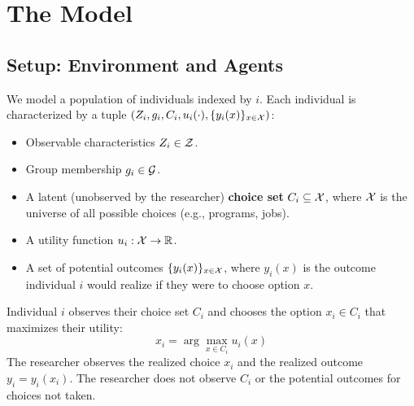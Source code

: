 
\section{The Model}\label{sec:model}

\subsection{Setup: Environment and Agents}


\begin{definition}
We model a population of individuals indexed by $i$. Each individual is characterized by a tuple $(Z_i, g_i, C_i, u_i(\cdot), \{y_i(x)\}_{x \in \mathcal{X}})$:
\begin{itemize}
    \item Observable characteristics $Z_i \in \mathcal{Z}$.
    \item Group membership $g_i \in \mathcal{G}$.
    \item A latent (unobserved by the researcher) \textbf{choice set} $C_i \subseteq \mathcal{X}$, where $\mathcal{X}$ is the universe of all possible choices (e.g., programs, jobs).
    \item A utility function $u_i: \mathcal{X} \to \mathbb{R}$.
    \item A set of potential outcomes $\{y_i(x)\}_{x \in \mathcal{X}}$, where $y_i(x)$ is the outcome individual $i$ would realize if they were to choose option $x$.
\end{itemize}
\end{definition}


\begin{definition}
Individual $i$ observes their choice set $C_i$ and chooses the option $x_i \in C_i$ that maximizes their utility:
\begin{equation}
x_i = \arg\max_{x \in C_i} u_i(x)
\end{equation}
The researcher observes the realized choice $x_i$ and the realized outcome $y_i = y_i(x_i)$. The researcher does not observe $C_i$ or the potential outcomes for choices not taken.
\end{definition}


